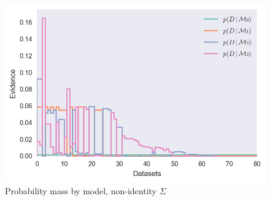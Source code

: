 \documentclass[12pt]{article}
\newenvironment{question}[2][Question]{\begin{trivlist}
\kern10pt
\item[\hskip \labelsep {\bfseries #1}\hskip \labelsep {\bfseries #2.}]}{\end{trivlist}}
\begin{document}
\begin{question}{29}
\begin{figure}
\includegraphics[scale=.7]{evidence_cov}
\centering
\caption{Probability mass by model, non-identity $\Sigma$}
\label{evidence_cov}
\end{figure}

\end{question}
 

 
\end{document}
